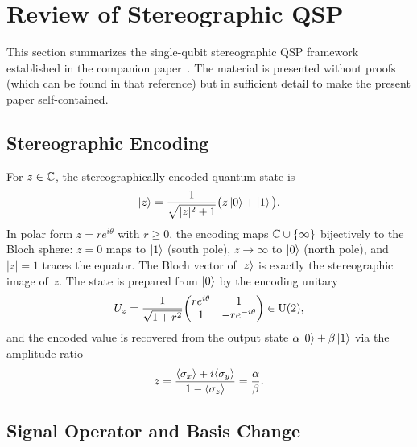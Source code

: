 \section{Review of Stereographic QSP}
\label{sec:review}

This section summarizes the single-qubit stereographic QSP
framework established in the companion
paper~\cite{KharaziLeytonOrtega2026a}.  The material is presented
without proofs (which can be found in that reference) but in
sufficient detail to make the present paper self-contained.

\subsection{Stereographic Encoding}
\label{subsec:review-encoding}

For $z \in \mathbb{C}$, the stereographically encoded quantum state is
\begin{equation}
	\ket{z} = \frac{1}{\sqrt{|z|^2 + 1}}\big(z\ket{0} + \ket{1}\big).
	\label{eq:encoding}
\end{equation}
In polar form $z = re^{i\theta}$ with $r \geq 0$, the encoding
maps $\mathbb{C} \cup \{\infty\}$ bijectively to the Bloch sphere:
$z = 0$ maps to $\ket{1}$ (south pole), $z \to \infty$ to
$\ket{0}$ (north pole), and $|z| = 1$ traces the equator.
The Bloch vector of $\ket{z}$ is exactly the stereographic
image of~$z$.  The state is prepared from $\ket{0}$ by the
encoding unitary
\begin{equation}
	U_z = \frac{1}{\sqrt{1+r^2}}\!\begin{pmatrix}
		re^{i\theta} & 1 \\ 1 & -re^{-i\theta}
	\end{pmatrix} \in \mathrm{U}(2),
	\label{eq:encoding-unitary}
\end{equation}
and the encoded value is recovered from the output state
$\alpha\ket{0} + \beta\ket{1}$ via the amplitude ratio
\begin{equation}
	z = \frac{\langle\sigma_x\rangle + i\langle\sigma_y\rangle}
	{1 - \langle\sigma_z\rangle} = \frac{\alpha}{\beta}.
	\label{eq:decoding}
\end{equation}

\subsection{Signal Operator and Basis Change}
\label{subsec:review-signal}

